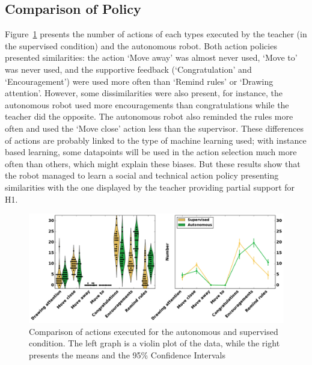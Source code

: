 \subsection{Comparison of Policy}

Figure~\ref{fig:tutoring_actions} presents the number of actions of each types executed by the teacher (in the supervised condition) and the autonomous robot. Both action policies presented similarities: the action `Move away' was almost never used, `Move to' was never used, and the supportive feedback (`Congratulation' and `Encouragement') were used more often than `Remind rules' or `Drawing attention'. However, some dissimilarities were also present, for instance, the autonomous robot used more encouragements than congratulations while the teacher did the opposite. The autonomous robot also reminded the rules more often and used the `Move close' action less than the supervisor. These differences of actions are probably linked to the type of machine learning used; with instance based learning, some datapoints will be used in the action selection much more often than others, which might explain these biases. But these results show that the robot managed to learn a social and technical action policy presenting similarities with the one displayed by the teacher providing partial support for H1.

\begin{figure}[ht]
	\includegraphics[width=1\linewidth]{actions.pdf}
	\centering
	\caption{Comparison of actions executed for the autonomous and supervised condition. The left graph is a violin plot of the data, while the right presents the means and the 95\% Confidence Intervals}
	\label{fig:tutoring_actions}
\end{figure}


